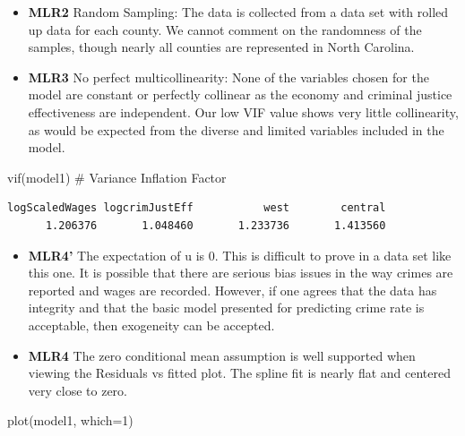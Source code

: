 \documentclass[]{article}
\newenvironment{Shaded}{}{}
\newcommand{\CommentTok}[1]{\textcolor[rgb]{0.00,0.50,0.00}{#1}}
\newcommand{\DataTypeTok}[1]{#1}
\newcommand{\DecValTok}[1]{#1}
\newcommand{\KeywordTok}[1]{\textcolor[rgb]{0.00,0.00,1.00}{#1}}
\newcommand{\NormalTok}[1]{#1}
\begin{document}
\begin{itemize}
\item
  \textbf{MLR2} Random Sampling: The data is collected from a data set
  with rolled up data for each county. We cannot comment on the
  randomness of the samples, though nearly all counties are represented
  in North Carolina.
\item
  \textbf{MLR3} No perfect multicollinearity: None of the variables
  chosen for the model are constant or perfectly collinear as the
  economy and criminal justice effectiveness are independent. Our low
  VIF value shows very little collinearity, as would be expected from
  the diverse and limited variables included in the model.
\end{itemize}

\begin{Shaded}
\begin{Highlighting}[]
\KeywordTok{vif}\NormalTok{(model1) }\CommentTok{# Variance Inflation Factor}
\end{Highlighting}
\end{Shaded}

\begin{verbatim}
logScaledWages logcrimJustEff           west        central 
      1.206376       1.048460       1.233736       1.413560 
\end{verbatim}

\begin{itemize}
\item
  \textbf{MLR4'} The expectation of u is 0. This is difficult to prove
  in a data set like this one. It is possible that there are serious
  bias issues in the way crimes are reported and wages are recorded.
  However, if one agrees that the data has integrity and that the basic
  model presented for predicting crime rate is acceptable, then
  exogeneity can be accepted.
\item
  \textbf{MLR4} The zero conditional mean assumption is well supported
  when viewing the Residuals vs fitted plot. The spline fit is nearly
  flat and centered very close to zero.
\end{itemize}

\begin{Shaded}
\begin{Highlighting}[]
\KeywordTok{plot}\NormalTok{(model1, }\DataTypeTok{which=}\DecValTok{1}\NormalTok{)}
\end{Highlighting}
\end{Shaded}
\end{document}
